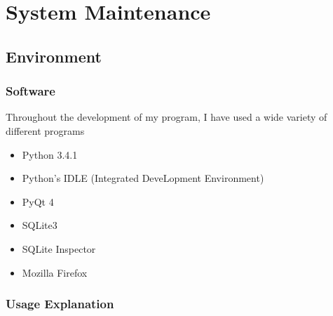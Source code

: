 \chapter{System Maintenance}

\section{Environment}

\subsection{Software}
Throughout the development of my program, I have used a wide variety of different programs
\begin{itemize}
    \item Python 3.4.1
    \item Python's IDLE (Integrated DeveLopment Environment)
    \item PyQt 4
    \item SQLite3
    \item SQLite Inspector
    \item Mozilla Firefox
\end{itemize}


\subsection{Usage Explanation}

